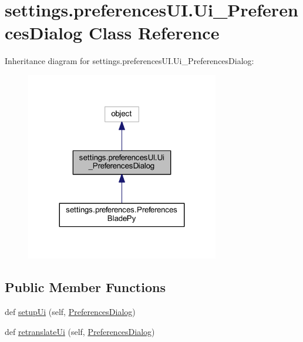 \hypertarget{a00106}{}\section{settings.\+preferences\+U\+I.\+Ui\+\_\+\+Preferences\+Dialog Class Reference}
\label{a00106}


Inheritance diagram for settings.\+preferences\+U\+I.\+Ui\+\_\+\+Preferences\+Dialog\+:\nopagebreak
\begin{figure}[H]
\begin{center}
\leavevmode
\includegraphics[width=239pt]{a00105}
\end{center}
\end{figure}
\subsection*{Public Member Functions}
\begin{DoxyCompactItemize}
\item 
def \hyperlink{a00106_a61eadae581e6b31932e65f89ee78760c}{setup\+Ui} (self, \hyperlink{a00060_a70162ca377a00273f0795162093f7958}{Preferences\+Dialog})
\item 
def \hyperlink{a00106_a29096d3ca31a6d880f3e4680987243e8}{retranslate\+Ui} (self, \hyperlink{a00060_a70162ca377a00273f0795162093f7958}{Preferences\+Dialog})
\end{DoxyCompactItemize}
